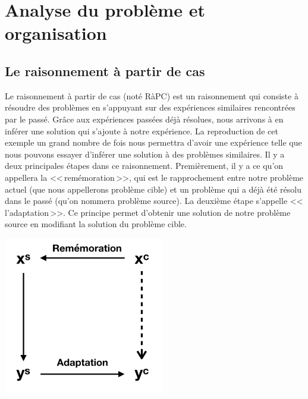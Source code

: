 \documentclass{article}
\begin{document}
\cleardoublepage


\section{Analyse du probl\`{e}me et organisation}

\subsection{Le raisonnement \`{a} partir de cas}
Le raisonnement \`{a} partir de cas (not\'{e} R\`{a}PC) est un raisonnement qui consiste \`{a} r\'{e}soudre des probl\`{e}mes en s'appuyant sur des exp\'{e}riences similaires rencontr\'{e}es par le pass\'{e}. Gr\^{a}ce aux exp\'{e}riences pass\'{e}es d\'{e}j\`{a} r\'{e}solues, nous arrivons \`{a} en inf\'{e}rer une solution qui s'ajoute \`{a} notre exp\'{e}rience. La reproduction de cet exemple un grand nombre de fois nous permettra d'avoir une exp\'{e}rience telle que nous pouvons essayer d'inf\'{e}rer une solution \`{a} des
probl\`{e}mes similaires.
\newline
\newline
Il y a deux principales \'{e}tapes dans ce raisonnement. Premi\`{e}rement, il y a ce qu'on appellera la <<\,rem\'{e}moration\,>>, qui est le rapprochement entre notre probl\`{e}me actuel (que nous appellerons probl\`{e}me cible) et un probl\`{e}me qui a d\'{e}j\`{a} \'{e}t\'{e} r\'{e}solu dans le pass\'{e} (qu'on nommera probl\`{e}me source). La deuxi\`{e}me \'{e}tape s'appelle <<\,l'adaptation\,>>. Ce principe permet d'obtenir une solution de notre probl\`{e}me source en modifiant la solution du probl\`{e}me cible.
\newline
\newline
\begin{center}
\includegraphics[width=7cm]{img1.png} %
\end{center}
\end{document}
